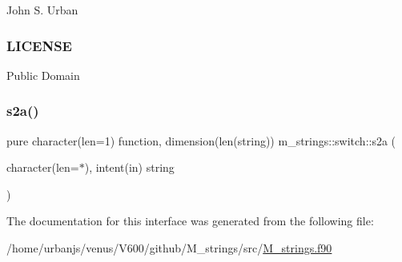 John S. Urban \subsubsection*{L\+I\+C\+E\+N\+SE}

Public Domain \mbox{\label{interfacem__strings_1_1switch_a60d3e2ead0b3cfd08eaf61f93d3caf57}} 
\subsubsection{\texorpdfstring{s2a()}{s2a()}}
{\footnotesize\ttfamily pure character(len=1) function, dimension(len(string)) m\+\_\+strings\+::switch\+::s2a (\begin{DoxyParamCaption}\item[{character(len=$\ast$), intent(in)}]{string }\end{DoxyParamCaption})\hspace{0.3cm}{\ttfamily [private]}}



The documentation for this interface was generated from the following file\+:\begin{DoxyCompactItemize}
\item 
/home/urbanjs/venus/\+V600/github/\+M\+\_\+strings/src/\mbox{\hyperlink{M__strings_8f90}{M\+\_\+strings.\+f90}}\end{DoxyCompactItemize}
